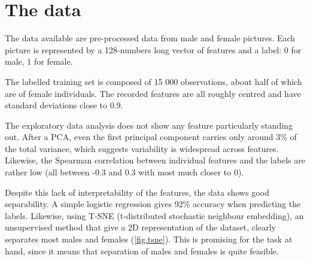 \documentclass[a4paper,11pt,openany,extrafontsizes,oneside,article,twocolumn]{memoir}
\begin{document}



\chapter{The data}

The data available are pre-processed data from male and female
pictures. Each picture is represented by a 128-numbers long vector of
features and a label: 0 for male, 1 for female.

The labelled training set is composed of 15 000 observations, about
half of which are of female individuals. The recorded features are all
roughly centred and have standard deviations close to 0.9.

The exploratory data analysis does not show any feature particularly
standing out. After a PCA, even the first principal component carries
only around 3\% of the total variance, which suggests variability is
widespread across features. Likewise, the Spearman correlation between
individual features and the labels are rather low (all between -0.3
and 0.3 with most much closer to 0).

Despite this lack of interpretability of the features, the data shows
good separability. A simple logistic regression gives 92\% accuracy
when predicting the labels. Likewise, using T-SNE (t-distributed
stochastic neighbour embedding), an unsupervised method that give a 2D
representation of the dataset, clearly separates most males and
females (\autoref{fig.tsne}). This is promising for the task at hand,
since it means that separation of males and females is quite feasible.
\end{document}
